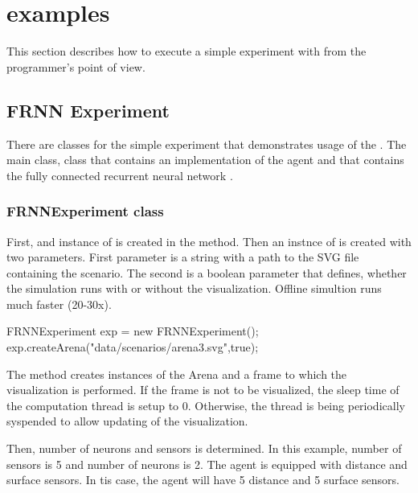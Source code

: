 \section{examples}

This section describes how to execute a simple experiment with \vivae from the programmer's point of view. 

\subsection{FRNN Experiment}

There are classes for the simple experiment that demonstrates usage of the \vivae . The main  class,  class that contains an implementation of the agent and  that contains the fully connected recurrent neural network \cite{FIXME}. 

\subsubsection{FRNNExperiment class}

First, and instance of  is created in the  method. Then an instnce of  is created with two parameters. First parameter is a string with a path to the SVG file containing the scenario. The second is a boolean parameter that defines, whether the simulation runs with or without the visualization. Offline simultion runs much faster (20-30x).
\begin{colorverbatim}
FRNNExperiment exp = new FRNNExperiment();
exp.createArena("data/scenarios/arena3.svg",true);
\end{colorverbatim}
The  method creates instances of the Arena and a frame to which the visualization is performed. If the frame is not to be visualized, the sleep time of the computation thread is setup to 0. Otherwise, the thread is being periodically syspended to allow updating of the visualization.

Then, number of neurons and sensors is determined. In this example, number of sensors is 5 and number of neurons is 2. The agent is equipped with distance and surface sensors. In tis case, the agent will have 5 distance and 5 surface sensors. 

